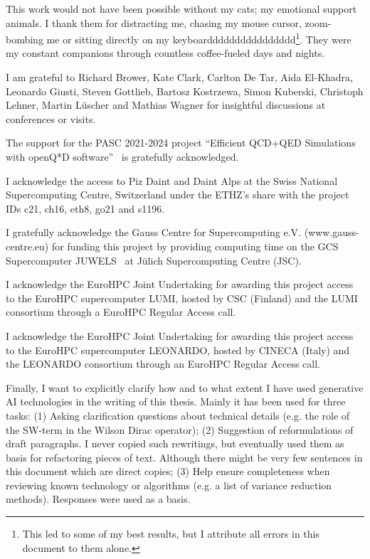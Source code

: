 This work would not have been possible without my cats; my emotional support animals.
I thank them for distracting me, chasing my mouse cursor, zoom-bombing me or sitting directly on my keyboardddddddddddddddd\footnote{This led to some of my best results, but I attribute all errors in this document to them alone.}.
They were my constant companions through countless coffee-fueled days and nights.

I am grateful to Richard Brower, Kate Clark, Carlton De Tar, Aida El-Khadra, Leonardo Giusti, Steven Gottlieb, Bartosz Kostrzewa, Simon Kuberski, Christoph Lehner, Martin Lüscher and Mathias Wagner for insightful discussions at conferences or visits.

The support for the PASC 2021-2024 project ``Efficient QCD+QED Simulations with openQ*D software''~\cite{online:pasc2021} is gratefully acknowledged.

I acknowledge the access to Piz Daint and Daint Alps at the Swiss National Supercomputing Centre, Switzerland under the ETHZ’s share with the project IDs c21, ch16, eth8, go21 and s1196.

I gratefully acknowledge the Gauss Centre for Supercomputing e.V. (www.gauss-centre.eu) for funding this project by providing computing time on the GCS Supercomputer JUWELS~\cite{juwels} at Jülich Supercomputing Centre (JSC). 

I acknowledge the EuroHPC Joint Undertaking for awarding this project access to the EuroHPC supercomputer LUMI, hosted by CSC (Finland) and the LUMI consortium through a EuroHPC Regular Access call.

I acknowledge the EuroHPC Joint Undertaking for awarding this project access to the EuroHPC supercomputer LEONARDO, hosted by CINECA (Italy) and the LEONARDO consortium through an EuroHPC Regular Access call.


Finally, I want to explicitly clarify how and to what extent I have used generative AI technologies in the writing of this thesis.
Mainly it has been used for three tasks:
(1) Asking clarification questions about technical details (e.g. the role of the SW-term in the Wilson Dirac operator);
(2) Suggestion of reformulations of draft paragraphs. 
I never copied such rewritings, but eventually used them as basis for refactoring pieces of text.
Although there might be very few sentences in this document which are direct copies;
(3) Help ensure completeness when reviewing known technology or algorithms (e.g. a list of variance reduction methods).
Responses were used as a basis.


\endgroup
